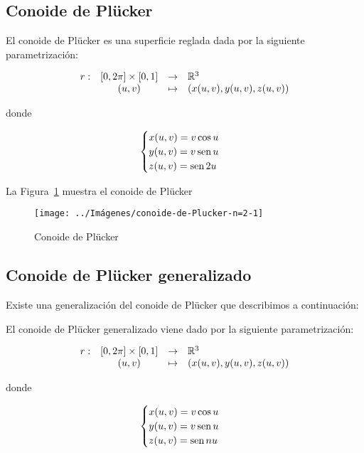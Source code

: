 \documentclass[10pt,a4paper]{article}
\begin{document}
\subsection{Conoide de Plücker}

\begin{defi}
El conoide de Plücker es una superficie reglada dada por la siguiente parametrización: 

$$\begin{array}{rcll}
r : & [0, 2\pi] \times [0,1] & \to & \mathbb{R}^3\\
& (u,v) & \mapsto & (x(u,v),y(u,v),z(u,v))
\end{array}$$

donde 

$$ \begin{cases}
x(u,v) = v \cos u \\
y(u,v) = v \mathop{\mbox{\normalfont sen}}\nolimits u \\
z(u,v) = \mathop{\mbox{\normalfont sen}}\nolimits 2u
\end{cases} $$
\end{defi}

La Figura~\ref{fig:conoide-de-Plucker-1} muestra el conoide de Plücker

\begin{figure}
	\centering
	\texttt{[image: ../Imágenes/conoide-de-Plucker-n=2-1]}
	\caption{Conoide de Plücker}
	\label{fig:conoide-de-Plucker-1}
\end{figure}

\subsection{Conoide de Plücker generalizado}

Existe una generalización del conoide de Plücker que describimos a continuación:

\begin{defi}
El conoide de Plücker generalizado viene dado por la siguiente parametrización:

$$\begin{array}{rcll}
r : & [0, 2\pi] \times [0,1] & \to & \mathbb{R}^3\\
& (u,v) & \mapsto & (x(u,v),y(u,v),z(u,v))
\end{array}$$

donde 

$$ \begin{cases}
x(u,v) = v \cos u \\
y(u,v) = v \mathop{\mbox{\normalfont sen}}\nolimits u \\
z(u,v) = \mathop{\mbox{\normalfont sen}}\nolimits nu
\end{cases} $$

\end{defi}
\end{document}

